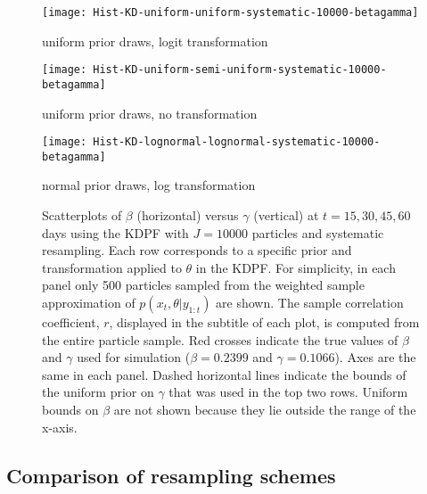 \documentclass{elsarticle}
\begin{document}
\begin{figure}

\begin{minipage}{1.0\linewidth}
\texttt{[image: Hist-KD-uniform-uniform-systematic-10000-betagamma]}
\vspace{-1.0cm}
\caption*{uniform prior draws, logit transformation}
\end{minipage}

\vspace{0.5cm}

\begin{minipage}{1.0\linewidth}
\texttt{[image: Hist-KD-uniform-semi-uniform-systematic-10000-betagamma]}
\vspace{-1.0cm}
\caption*{uniform prior draws, no transformation}
\end{minipage}

\vspace{0.5cm}

\begin{minipage}{1.0\linewidth}
\texttt{[image: Hist-KD-lognormal-lognormal-systematic-10000-betagamma]}
\vspace{-1.0cm}
\caption*{normal prior draws, log transformation}
\end{minipage}

\caption{Scatterplots of $\beta$ (horizontal) versus $\gamma$ (vertical) at $t = 15, 30, 45, 60$ days using the KDPF with $J = 10000$ particles and systematic resampling. Each row corresponds to a specific prior and transformation applied to $\theta$ in the KDPF. For simplicity, in each panel only 500 particles sampled from the weighted sample approximation of $p(x_t,\theta|y_{1:t})$ are shown. The sample correlation coefficient, $r$, displayed in the subtitle of each plot, is computed from the entire particle sample. Red crosses indicate the true values of $\beta$ and $\gamma$ used for simulation ($\beta = 0.2399$ and $\gamma = 0.1066$). Axes are the same in each panel. Dashed horizontal lines indicate the bounds of the uniform prior on $\gamma$ that was used in the top two rows. Uniform bounds on $\beta$ are not shown because they lie outside the range of the x-axis.} \label{fig:priors}

\end{figure}

\subsection{Comparison of resampling schemes \label{sec:resample}}
\end{document}

